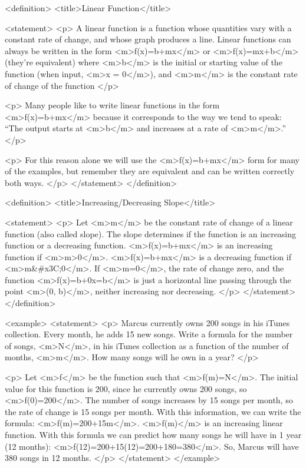     <definition>
        <title>Linear Function</title>

        <statement>
            <p>
                A linear function is a function whose quantities vary with a constant rate of change, and whose graph produces a line.
                Linear functions can always be written in the form <m>f(x)=b+mx</m> or <m>f(x)=mx+b</m> (they’re equivalent) where <m>b</m> is the initial or starting value of the function (when input, <m>x = 0</m>), and <m>m</m> is the constant rate of change of the function
            </p>

            <p>
                Many people like to write linear functions in the form <m>f(x)=b+mx</m> because it corresponds to the way we tend to speak: “The output starts at <m>b</m> and increases at a rate of <m>m</m>.”
            </p>

            <p>
                For this reason alone we will use the <m>f(x)=b+mx</m> form for many of the examples, but remember they are equivalent and can be written correctly both ways.
            </p>
        </statement>
    </definition>

    <definition>
        <title>Increasing/Decreasing Slope</title>

        <statement>
            <p>
                Let <m>m</m> be the constant rate of change of a linear function (also called slope).
                The slope determines if the function is an increasing function or a decreasing function.
                <m>f(x)=b+mx</m> is an increasing function if <m>m>0</m>.
                <m>f(x)=b+mx</m> is a decreasing function if <m>m&#x3C;0</m>.
                If <m>m=0</m>, the rate of change zero, and the function <m>f(x)=b+0x=b</m> is just a horizontal line passing through the point <m>(0, b)</m>, neither increasing nor decreasing.
            </p>
        </statement>
    </definition>

    <example>
        <statement>
            <p>
                Marcus currently owns 200 songs in his iTunes collection.
                Every month, he adds 15 new songs.
                Write a formula for the number of songs, <m>N</m>, in his iTunes collection as a function of the number of months, <m>m</m>.
                How many songs will he own in a year?
            </p>

            <p>
                Let <m>f</m> be the function such that <m>f(m)=N</m>.
                The initial value for this function is 200, since he currently owns 200 songs, so <m>f(0)=200</m>.
                The number of songs increases by 15 songs per month, so the rate of change is 15 songs per month.
                With this information, we can write the formula: <m>f(m)=200+15m</m>.
                <m>f(m)</m> is an increasing linear function.
                With this formula we can predict how many songs he will have in 1 year (12 months): <m>f(12)=200+15(12)=200+180=380</m>.
                So, Marcus will have 380 songs in 12 months.
            </p>
        </statement>
    </example>

